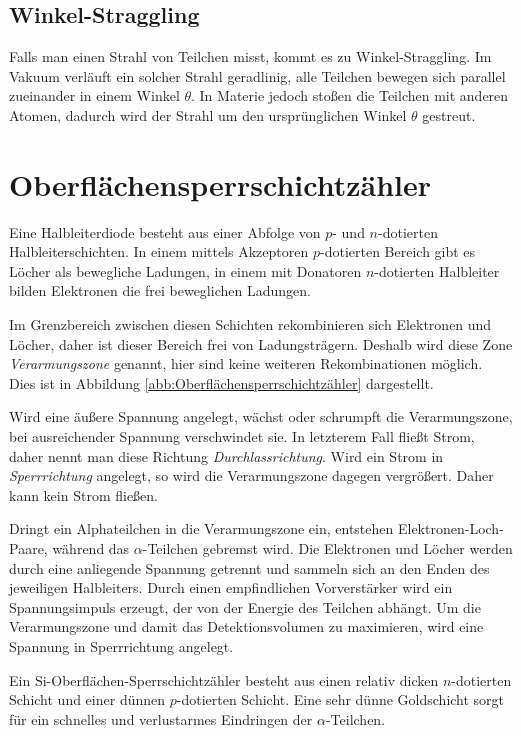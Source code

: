 \documentclass[12pt,a4paper]{scrartcl}
\numberwithin{equation}{section} %
\renewcommand{\[}{} %
\renewcommand{\]}{\noindent} %
\begin{document}
\hypertarget{winkel-straggling}{%
\subsection{Winkel-Straggling}\label{winkel-straggling}}

Falls man einen Strahl von Teilchen misst, kommt es zu
Winkel-Straggling. Im Vakuum verläuft ein solcher Strahl geradlinig,
alle Teilchen bewegen sich parallel zueinander in einem Winkel
$\theta$. In Materie jedoch stoßen die Teilchen mit anderen Atomen,
dadurch wird der Strahl um den ursprünglichen Winkel $\theta$
gestreut.

\hypertarget{oberfluxe4chensperrschichtzuxe4hler}{%
\section{Oberflächensperrschichtzähler}\label{oberfluxe4chensperrschichtzuxe4hler}}

Eine Halbleiterdiode besteht aus einer Abfolge von $p$- und
$n$-dotierten Halbleiterschichten. In einem mittels Akzeptoren
$p$-dotierten Bereich gibt es Löcher als bewegliche Ladungen, in einem
mit Donatoren $n$-dotierten Halbleiter bilden Elektronen die frei
beweglichen Ladungen.

Im Grenzbereich zwischen diesen Schichten rekombinieren sich Elektronen
und Löcher, daher ist dieser Bereich frei von Ladungsträgern. Deshalb
wird diese Zone \emph{Verarmungszone} genannt, hier sind keine weiteren
Rekombinationen möglich. Dies ist in Abbildung \ref{abb:Oberflächensperrschichtzähler} dargestellt.

Wird eine äußere Spannung angelegt, wächst oder schrumpft die
Verarmungszone, bei ausreichender Spannung verschwindet sie. In
letzterem Fall fließt Strom, daher nennt man diese Richtung
\emph{Durchlassrichtung}. Wird ein Strom in \emph{Sperrrichtung}
angelegt, so wird die Verarmungszone dagegen vergrößert. Daher kann kein
Strom fließen.

Dringt ein Alphateilchen in die Verarmungszone ein, entstehen
Elektronen-Loch-Paare, während das $\alpha$-Teilchen gebremst wird.
Die Elektronen und Löcher werden durch eine anliegende Spannung getrennt
und sammeln sich an den Enden des jeweiligen Halbleiters. Durch einen
empfindlichen Vorverstärker wird ein Spannungsimpuls erzeugt, der von
der Energie des Teilchen abhängt. Um die Verarmungszone und damit das
Detektionsvolumen zu maximieren, wird eine Spannung in Sperrrichtung
angelegt.

Ein $\mathrm{Si}$-Oberflächen-Sperrschichtzähler besteht aus einen
relativ dicken $n$-dotierten Schicht und einer dünnen $p$-dotierten
Schicht. Eine sehr dünne Goldschicht sorgt für ein schnelles und
verlustarmes Eindringen der $\alpha$-Teilchen.
\end{document}
